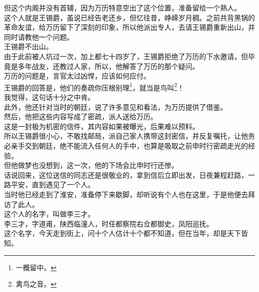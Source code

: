 \begin{multicols}{\theparacolNo}
但这个内阁并没有首辅，因为万历特意空出了这个位置，准备留给一个熟人。\\

这个人就是王锡爵，虽说已经告老还乡，但忆往昔，峥嵘岁月稠。之前共背黑锅的革命友谊，给万历留下了深刻的印象，所以他派出专人，去请王锡爵重新出山，并同时请教他一个问题。\\

王锡爵不出山。\\

由于此前被人坑过一次，加上都七十四岁了，王锡爵拒绝了万历的下水邀请，但毕竟是多年战友，还教过人家，所以，他解答了万历的那个疑问。\\

万历的问题是，言官太过凶悍，应该如何应付。\\

王锡爵的回答是，他们的奏疏你压根别理\footnote{一概留中。}，就当是鸟叫\footnote{禽鸟之音。}！\\

我觉得，这句话十分之中肯。\\

此外，他还针对当时的朝廷，说了许多意见和看法，为万历提供了借鉴。\\

然后，他把这些内容写成了密疏，派人送给万历。\\

这是一封极为机密的信件，其内容如果被曝光，后果难以预料。\\

所以王锡爵很小心，不敢找邮局，派自己家人携带这封密信，并反复嘱托，让他务必亲手交到朝廷，绝不能流入任何人的手中，也算是吸取之前申时行密疏走光的经验。\\

但他做梦也没想到，这一次，他的下场会比申时行还惨。\\

话说回来，这位送信的同志还是很敬业的，拿到信后立即出发，日夜兼程赶路，一路平安，直到遇见了一个人。\\

当时他已经走到了淮安，准备停下来歇脚，却听说有个人也在这里，于是他便去拜访了此人。\\

这个人的名字，叫做李三才。\\

李三才，字道甫，陕西临潼人，时任都察院右佥都御史，凤阳巡抚。\\

这个名字，今天走到街上，问十个人估计十个都不知道，但在当年，却是天下皆知。\\


\end{multicols}
